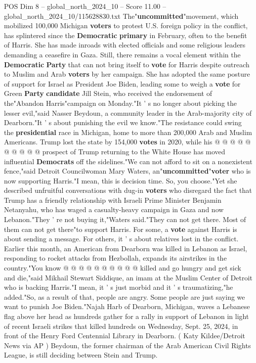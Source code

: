 \begin{textsample}{POS Dim 8 – global\_north\_2024\_10 – Score 11.00 – global\_north\_2024\_10/115628830.txt}  \label{ex:f8_pos_167}
The"\textbf{uncommitted}"movement, which mobilized 100,000 Michigan \textbf{voters} to protest U.S. foreign policy in the conflict, has splintered since the \textbf{Democratic} \textbf{primary} in February, often to the benefit of Harris.
She has made inroads with elected officials and some religious leaders demanding a ceasefire in Gaza.
Still, there remains a vocal element within the \textbf{Democratic} \textbf{Party} that can not bring itself to \textbf{vote} for Harris despite outreach to Muslim and Arab \textbf{voters} by her campaign.
She has adopted the same posture of support for Israel as President Joe Biden, leading some to weigh a \textbf{vote} for Green \textbf{Party} \textbf{candidate} Jill Stein, who received the endorsement of the"Abandon Harris"campaign on Monday."It ' s no longer about picking the lesser evil,"said Nasser Beydoun, a community leader in the Arab-majority city of Dearborn."It ' s about punishing the evil we know."The resistance could swing the \textbf{presidential} race in Michigan, home to more than 200,000 Arab and Muslim Americans.
Trump lost the state by 154,000 \textbf{votes} in 2020, while his @ @ @ @ @ @ @ @ @ @ prospect of Trump returning to the White House has moved influential \textbf{Democrats} off the sidelines."We can not afford to sit on a nonexistent fence,"said Detroit Councilwoman Mary Waters, an"\textbf{uncommitted}"\textbf{voter} who is now supporting Harris."I mean, this is decision time.
So, you choose."Yet she described unfruitful conversations with dug-in \textbf{voters} who disregard the fact that Trump has a friendly relationship with Israeli Prime Minister Benjamin Netanyahu, who has waged a casualty-heavy campaign in Gaza and now Lebanon."They ' re not buying it,"Waters said."They can not get there.
Most of them can not get there"to support Harris.
For some, a \textbf{vote} against Harris is about sending a message.
For others, it ' s about relatives lost in the conflict.
Earlier this month, an American from Dearborn was killed in Lebanon as Israel, responding to rocket attacks from Hezbollah, expands its airstrikes in the country."You know @ @ @ @ @ @ @ @ @ @ killed and go hungry and get sick and die,"said Mikhail Stewart Siddique, an imam at the Muslim Center of Detroit who is backing Harris."I mean, it ' s just morbid and it ' s traumatizing,"he added."So, as a result of that, people are angry.
Some people are just saying we want to punish Joe Biden."Najah Harb of Dearborn, Michigan, waves a Lebanese flag above her head as hundreds gather for a rally in support of Lebanon in light of recent Israeli strikes that killed hundreds on Wednesday, Sept. 25, 2024, in front of the Henry Ford Centennial Library in Dearborn. ( Katy Kildee/Detroit News via AP ) Beydoun, the former chairman of the Arab American Civil Rights League, is still deciding between Stein and Trump.

\end{textsample}
